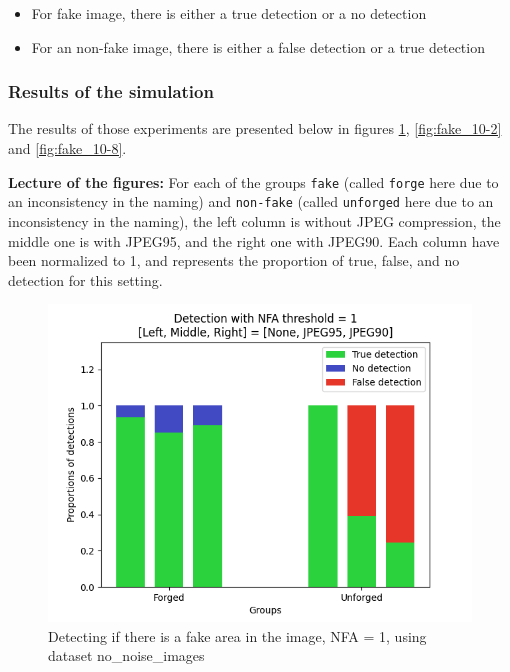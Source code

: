 \documentclass[sigconf, nonacm]{acmart}
\begin{document}
\begin{itemize}
    \item For fake image, there is either a true detection or a no detection
    \item For an non-fake image, there is either a false detection or a true detection
\end{itemize}

\subsubsection{Results of the simulation}

The results of those experiments are presented below in figures \ref{fig:fake_10-0}, \ref{fig:fake_10-2} and \ref{fig:fake_10-8}.

\medskip \textbf{Lecture of the figures:} For each of the groups \texttt{fake} (called \texttt{forge} here due to an inconsistency in the naming) and \texttt{non-fake} (called \texttt{unforged} here due to an inconsistency in the naming), the left column is without JPEG compression, the middle one is with JPEG95, and the right one with JPEG90. Each column have been normalized to 1, and represents the proportion of true, false, and no detection for this setting.

\begin{figure}[p]
    \centering
    \includegraphics[width=0.93\columnwidth]{figures/forgery_detection_nfa_1.png}
    \caption{Detecting if there is a fake area in the image, NFA = 1, using dataset no\_noise\_images \cite{colom_noise_2023}}
    \label{fig:fake_10-0}
\end{figure}
\end{document}
